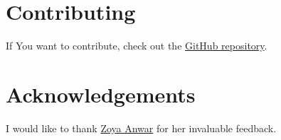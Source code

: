 \documentclass{article}
\begin{document}
\section{Contributing}
\label{sec:contributing}
If You want to contribute, check out the \href{https://github.com/marzipan14/git_tips}{GitHub repository}.

\section{Acknowledgements}
I would like to thank \href{https://www.linkedin.com/in/zoya-anwar/}{Zoya Anwar} for her invaluable feedback.
\end{document}
